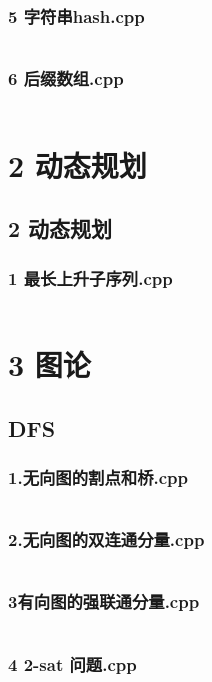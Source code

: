 \documentclass{article}
\begin{document}
\subsubsection{5 字符串hash.cpp}
\inputminted{c++}{/home/zzuzxy/t2/ACM-template/1 数据结构/字符串/5 字符串hash.cpp}
\subsubsection{6 后缀数组.cpp}
\inputminted{c++}{/home/zzuzxy/t2/ACM-template/1 数据结构/字符串/6 后缀数组.cpp}
\section{2 动态规划}
\subsection{2 动态规划}
\subsubsection{1 最长上升子序列.cpp}
\inputminted{c++}{/home/zzuzxy/t2/ACM-template/2 动态规划/1 最长上升子序列.cpp}
\section{3 图论}
\subsection{DFS}
\subsubsection{1.无向图的割点和桥.cpp}
\inputminted{c++}{/home/zzuzxy/t2/ACM-template/3 图论/DFS/1.无向图的割点和桥.cpp}
\subsubsection{2.无向图的双连通分量.cpp}
\inputminted{c++}{/home/zzuzxy/t2/ACM-template/3 图论/DFS/2.无向图的双连通分量.cpp}
\subsubsection{3有向图的强联通分量.cpp}
\inputminted{c++}{/home/zzuzxy/t2/ACM-template/3 图论/DFS/3有向图的强联通分量.cpp}
\subsubsection{4 2-sat 问题.cpp}
\inputminted{c++}{/home/zzuzxy/t2/ACM-template/3 图论/DFS/4 2-sat 问题.cpp}
\end{document}
